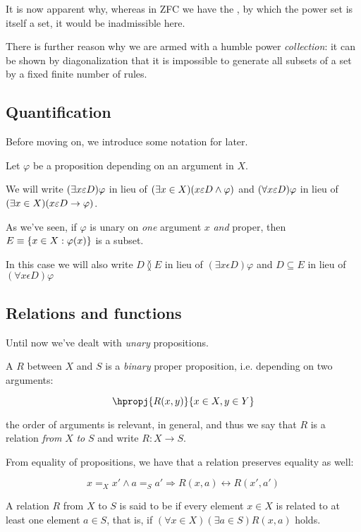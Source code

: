 It is now apparent why, whereas in ZFC we have the , by which the power set is itself a set, it would be
inadmissible here.

There is further reason why we are armed with a humble power
\emph{collection}: it can be shown by diagonalization that it is
impossible to generate all subsets of a set by a fixed finite number
of rules.

\subsection{Quantification}
Before moving on, we introduce some notation for later.

Let \(\varphi\) be a proposition depending on an argument in \(X\).

We will write \((\exists x \varepsilon D)\varphi\) in lieu of
\((\exists x \in X)(x \varepsilon D \wedge \varphi)\) and
\((\forall x \varepsilon D)\varphi\) in lieu of
\((\exists x \in X)(x \varepsilon D \rightarrow \varphi)\).

As we've seen, if \(\varphi\) is unary on \emph{one} argument \(x\)
\emph{and} proper, then \(E \equiv \{x \in X : \varphi(x) \}\) is a
subset.

In this case we will also write \(D \between E\) in lieu of
\((\exists x \epsilon D)\varphi\) and \(D \subseteq E\) in lieu of
\((\forall x \epsilon D)\varphi\)


\subsection{Relations and functions}
Until now we've dealt with \emph{unary} propositions.

A  $R$ between $X$ and $S$ is a \emph{binary} proper
proposition, i.e. depending on two arguments:

\[ \hpropj{R(x, y)}{x \in X, y \in Y} \]

the order of arguments is relevant, in general, and thus we say that
$R$ is a relation \emph{from} $X$ \emph{to} $S$ and write
$R : X \rightarrow S$.

From equality of propositions, we have that a relation preserves
equality as well:

\[ x =_X x' \wedge a =_S a' \Rightarrow R(x, a) \leftrightarrow R(x' ,
  a' )\]

A relation $R$ from $X$ to $S$ is said to be  if every
element \(x \in X\) is related to at least one element \(a \in S\),
that is, if \((\forall x \in X)(\exists a \in S)R(x, a)\) holds.

